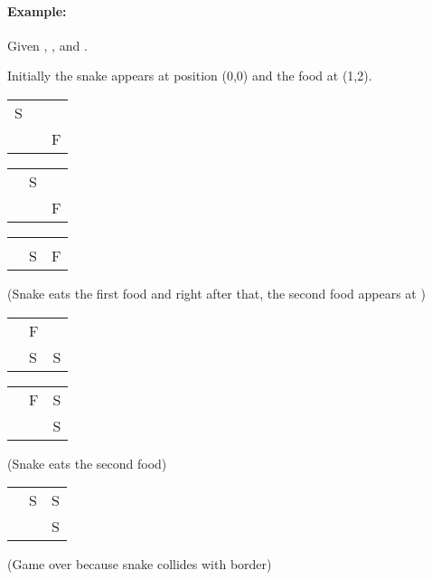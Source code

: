 \paragraph{Example:}
\begin{flushleft}

Given , , and .


Initially the snake appears at position (0,0) and the food at (1,2).

\begin{table}[H]
\begin{tabular}{|l|l|l|}
S &  &   \\
  &  & F
\end{tabular}
\end{table}


\begin{table}[H]
\begin{tabular}{|l|l|l|}
 & S &   \\
  &  & F
\end{tabular}
\end{table}


\begin{table}[H]
\begin{tabular}{|l|l|l|}
 &  &   \\
  & S & F
\end{tabular}
\end{table}

 (Snake eats the first food and right after that, the second food appears at  )

\begin{table}[H]
\begin{tabular}{|l|l|l|}
 & F &   \\
  & S & S
\end{tabular}
\end{table}


\begin{table}[H]
\begin{tabular}{|l|l|l|}
 & F & S   \\
  &  & S
\end{tabular}
\end{table}

 (Snake eats the second food)

\begin{table}[H]
\begin{tabular}{|l|l|l|}
 & S & S  \\
  &  & S
\end{tabular}
\end{table}

 (Game over because snake collides with border)
\end{flushleft}

